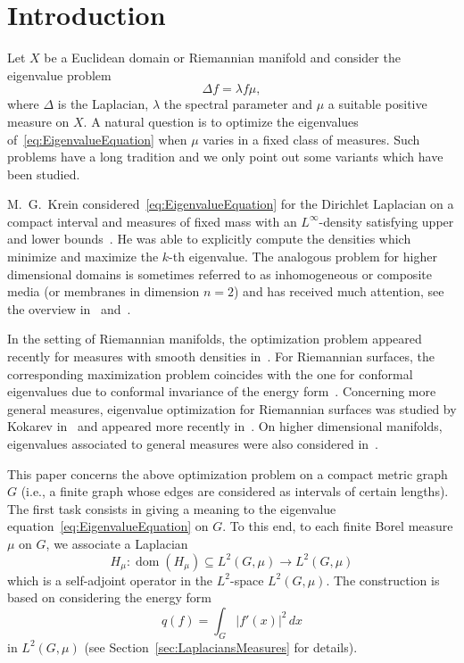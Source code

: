 \documentclass[reqno]{amsart}
\theoremstyle{plain}
\theoremstyle{definition}
\theoremstyle{remark}
\numberwithin{equation}{section}
\newcommand{\dom}{\operatorname{dom}}
\begin{document}
	\section{Introduction}
	Let $X$ be a Euclidean domain or Riemannian manifold and consider the eigenvalue problem
	\begin{equation} \label{eq:EigenvalueEquation}
	\Delta f = \lambda f  \mu,
	\end{equation}
	where $\Delta$ is the Laplacian, $\lambda$ the spectral parameter and $\mu$ a suitable positive measure on $X$. A natural question is to optimize the eigenvalues of~\eqref{eq:EigenvalueEquation} when $\mu$ varies in a fixed class of measures. Such problems have a long tradition and we only point out some variants which have been studied.
	
	
	 M.\ G.\ Krein considered~\eqref{eq:EigenvalueEquation} for the Dirichlet Laplacian on a compact interval and measures of fixed mass with an $L^\infty$-density satisfying upper and lower bounds~\cite{krein}. He was able to explicitly compute the densities which minimize and maximize the $k$-th eigenvalue. The analogous problem for higher dimensional domains is sometimes referred to as inhomogeneous or composite media (or membranes in dimension $n=2$) and has received much attention, see the overview in~\cite[Chapter 9]{henrot} and~\cite{cgiko, cmI, cmII, friedland}.

	In the setting of Riemannian manifolds, the optimization problem appeared recently for measures with smooth densities in~\cite{ce19, ces15, ksII, vinokurov}. For Riemannian surfaces, the corresponding maximization problem coincides with the one for conformal eigenvalues due to conformal invariance of the energy form~\cite{ce03}. Concerning more general measures, eigenvalue optimization for Riemannian surfaces was studied by Kokarev in~\cite{kokarev} and appeared more recently in~\cite{ksI}. On higher dimensional manifolds, eigenvalues associated to general measures were also considered in~\cite{gkl}.


	\smallskip
	
	This paper concerns the above optimization problem on a compact metric graph~$G$ (i.e., a finite graph whose edges are considered as intervals of certain lengths). The first task consists in giving a meaning to the eigenvalue equation~\eqref{eq:EigenvalueEquation} on $G$. To this end, to each finite Borel measure $\mu$ on $G$, we associate a Laplacian
	\[
	H_\mu \colon \dom(H_\mu) \subseteq L^2(G, \mu) \to L^2(G, \mu)
	\]
	which is a self-adjoint  operator in the $L^2$-space $L^2(G, \mu)$. The construction is based on considering the energy form
	\[
	q(f) =\int_G |f'(x)|^2 \, dx
	\]
	in $L^2(G, \mu)$ (see Section~\ref{sec:LaplaciansMeasures} for details).
	
\end{document}
